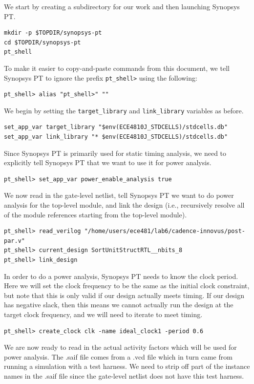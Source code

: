\documentclass[a4paper,12pt,twoside]{article}
\begin{document}
We start by creating a subdirectory for our work and then launching Synopsys PT.
\begin{verbatim}
mkdir -p $TOPDIR/synopsys-pt
cd $TOPDIR/synopsys-pt
pt_shell
\end{verbatim}
To make it easier to copy-and-paste commands from this document, we tell Synopsys PT to ignore the prefix \texttt{pt\_shell>} using the following:
\begin{verbatim}
pt_shell> alias "pt_shell>" ""
\end{verbatim}
We begin by setting the \texttt{target\_library} and \texttt{link\_library} variables as before.
\begin{verbatim}
set_app_var target_library "$env(ECE4810J_STDCELLS)/stdcells.db"
set_app_var link_library "* $env(ECE4810J_STDCELLS)/stdcells.db"
\end{verbatim}
Since Synopsys PT is primarily used for static timing analysis, we need to explicitly tell Synopsys PT that we want to use it for power analysis.
\begin{verbatim}
pt_shell> set_app_var power_enable_analysis true
\end{verbatim}
We now read in the gate-level netlist, tell Synopsys PT we want to do power analysis for the top-level module, and link the design (i.e., recursively resolve all of the module references starting from the top-level module).
\begin{verbatim}
pt_shell> read_verilog "/home/users/ece481/lab6/cadence-innovus/post-par.v"
pt_shell> current_design SortUnitStructRTL__nbits_8
pt_shell> link_design
\end{verbatim}
In order to do a power analysis, Synopsys PT needs to know the clock period. Here we will set the clock frequency to be the same as the initial clock constraint, but note that this is only valid if our design actually meets timing. If our design has negative slack, then this means we cannot actually run the design at the target clock frequency, and we will need to iterate to meet timing.
\begin{verbatim}
pt_shell> create_clock clk -name ideal_clock1 -period 0.6
\end{verbatim}
We are now ready to read in the actual activity factors which will be used for power analysis. The .saif file comes from a .vcd file which in turn came from running a simulation with a test harness. We need to strip off part of the instance names in the .saif file since the gate-level netlist does not have this test harness.
\end{document}
